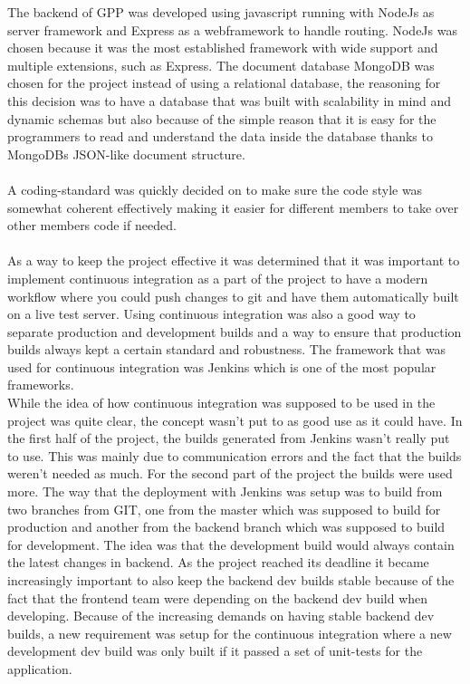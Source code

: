 The backend of GPP was developed using javascript running with NodeJs as server framework and Express as a webframework to handle routing. NodeJs was chosen because it was the most established framework with wide support and multiple extensions, such as Express.
The document database MongoDB was chosen for the project instead of using a relational database, the reasoning for this decision was to have a database that was built with scalability in mind and dynamic schemas but also because of the simple reason that it is easy for the programmers to read and understand the data inside the database thanks to MongoDBs JSON-like document structure.\\
\\
A coding-standard was quickly decided on to make sure the code style was somewhat coherent effectively making it easier for different members to take over other members code if needed.\\
\\
As a way to keep the project effective it was determined that it was important to implement continuous integration as a part of the project to have a modern workflow where you could push changes to git and have them automatically built on a live test server. Using continuous integration was also a good way to separate production and development builds and a way to ensure that production builds always kept a certain standard and robustness. The framework that was used for continuous integration was Jenkins which is one of the most popular frameworks.\\
While the idea of how continuous integration was supposed to be used in the project was quite clear, the concept wasn't put to as good use as it could have. In the first half of the project, the builds generated from Jenkins wasn't really put to use. This was mainly due to communication errors and the fact that the builds weren't needed as much. For the second part of the project the builds were used more. The way that the deployment with Jenkins was setup was to build from two branches from GIT, one from the master which was supposed to build for production and another from the backend branch which was supposed to build for development. The idea was that the development build would always contain the latest changes in backend. As the project reached its deadline it became increasingly important to also keep the backend dev builds stable because of the fact that the frontend team were depending on the backend dev build when developing.
Because of the increasing demands on having stable backend dev builds, a new requirement was setup for the continuous integration where a new development dev build was only built if it passed a set of unit-tests for the application.\\
